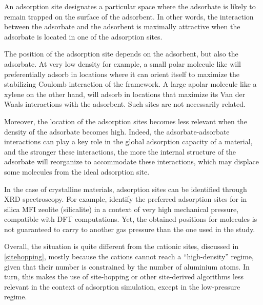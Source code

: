 \documentclass[main.tex]{subfiles}
\begin{document}
\label{adsorptionsites}


An adsorption site designates a particular space where the adsorbate is likely to remain trapped on the surface of the adsorbent. In other words, the interaction between the adsorbate and the adsorbent is maximally attractive when the adsorbate is located in one of the adsorption sites.

The position of the adsorption site depends on the adsorbent, but also the adsorbate. At very low density for example, a small polar molecule like  will preferentially adsorb in locations where it can orient itself to maximize the stabilizing Coulomb interaction of the framework. A large apolar molecule like a xylene on the other hand, will adsorb in locations that maximize its Van der Waals interactions with the adsorbent. Such sites are not necessarily related.

Moreover, the location of the adsorption sites becomes less relevant when the density of the adsorbate becomes high. Indeed, the adsorbate-adsorbate interactions can play a key role in the global adsorption capacity of a material, and the stronger these interactions, the more the internal structure of the adsorbate will reorganize to accommodate these interactions, which may displace some molecules from the ideal adsorption site.

In the case of crystalline materials, adsorption sites can be identified through XRD spectroscopy. For example, \textcite{CO2SitesInMFI} identify the preferred adsorption sites for  in silica MFI zeolite (silicalite) in a context of very high mechanical pressure, compatible with DFT computations. Yet, the obtained positions for  molecules is not guaranteed to carry to another gas pressure than the one used in the study.

Overall, the situation is quite different from the cationic sites, discussed in \cref{sitehopping}, mostly because the cations cannot reach a ``high-density'' regime, given that their number is constrained by the number of aluminium atoms. In turn, this makes the use of site-hopping or other site-derived algorithms less relevant in the context of adsorption simulation, except in the low-pressure regime.
\end{document}
